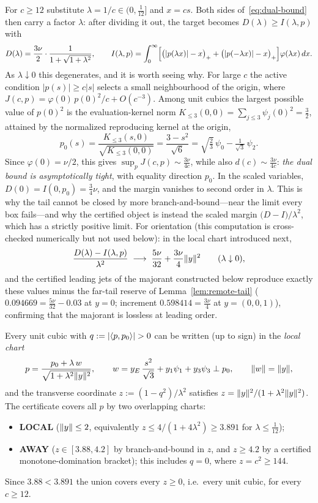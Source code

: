 For $c\ge12$ substitute $\lambda=1/c\in(0,\tfrac1{12}]$ and $x=cs$. Both sides of~\eqref{eq:dual-bound} then carry a factor $\lambda$: after dividing it out, the target becomes $D(\lambda)\ge I(\lambda,p)$ with
\[
        D(\lambda)=\frac{3\nu}{2}\cdot\frac{1}{1+\sqrt{1+\lambda^2}},
        \qquad
        I(\lambda,p)=\int_0^\infty\Bigl[\bigl(|p(\lambda x)|-x\bigr)_++\bigl(|p(-\lambda x)|-x\bigr)_+\Bigr]\varphi(\lambda x)\,dx .
\]
As $\lambda\downarrow0$ this degenerates, and it is worth seeing why. For large $c$ the active condition $|p(s)|\ge c|s|$ selects a small neighbourhood of the origin, where $J(c,p)=\varphi(0)\,p(0)^2/c+O(c^{-3})$. Among unit cubics the largest possible value of $p(0)^2$ is the evaluation-kernel norm $K_{\le3}(0,0)=\sum_{j\le3}\psi_j(0)^2=\tfrac32$, attained by the normalized reproducing kernel at the origin,
\[
        p_0(s)=\frac{K_{\le3}(s,0)}{\sqrt{K_{\le3}(0,0)}}=\frac{3-s^2}{\sqrt6}=\sqrt{\tfrac23}\,\psi_0-\tfrac{1}{\sqrt3}\,\psi_2 .
\]
Since $\varphi(0)=\nu/2$, this gives $\sup_pJ(c,p)\sim\tfrac{3\nu}{4c}$, while also $d(c)\sim\tfrac{3\nu}{4c}$: \emph{the dual bound is asymptotically tight}, with equality direction $p_0$. In the scaled variables, $D(0)=I(0,p_0)=\tfrac34\nu$, and the margin vanishes to second order in $\lambda$. This is why the tail cannot be closed by more branch-and-bound---near the limit every box fails---and why the certified object is instead the scaled margin $\bigl(D-I\bigr)/\lambda^2$, which has a strictly positive limit. For orientation (this computation is cross-checked numerically but not used below): in the local chart introduced next,
\[
        \frac{D(\lambda)-I(\lambda,p)}{\lambda^2}
        \;\longrightarrow\;
        \frac{5\nu}{32}+\frac{3\nu}{4}\lVert y\rVert^2
        \qquad(\lambda\downarrow0),
\]
and the certified leading jets of the majorant constructed below reproduce exactly these values minus the far-tail reserve of Lemma~\ref{lem:remote-tail} ($0.094669=\tfrac{5\nu}{32}-0.03$ at $y=0$; increment $0.598414=\tfrac{3\nu}{4}$ at $y=(0,0,1)$), confirming that the majorant is lossless at leading order.

Every unit cubic with $q:=|\ip{p}{p_0}|>0$ can be written (up to sign) in the \emph{local chart}
\[
        p=\frac{p_0+\lambda\,w}{\sqrt{1+\lambda^2\lVert y\rVert^2}},
        \qquad
        w=y_E\,\frac{s^2}{\sqrt3}+y_1\psi_1+y_3\psi_3\perp p_0,
        \qquad
        \lVert w\rVert=\lVert y\rVert,
\]
and the transverse coordinate $z:=(1-q^2)/\lambda^2$ satisfies $z=\lVert y\rVert^2/(1+\lambda^2\lVert y\rVert^2)$. The certificate covers all $p$ by two overlapping charts:
\begin{itemize}
\item \textbf{LOCAL} ($\lVert y\rVert\le2$, equivalently $z\le4/(1+4\lambda^2)\ge3.891$ for $\lambda\le\tfrac1{12}$);
\item \textbf{AWAY} ($z\in[3.88,4.2]$ by branch-and-bound in $z$, and $z\ge4.2$ by a certified monotone-domination bracket); this includes $q=0$, where $z=c^2\ge144$.
\end{itemize}
Since $3.88<3.891$ the union covers every $z\ge0$, i.e.\ every unit cubic, for every $c\ge12$.

